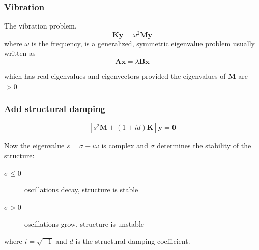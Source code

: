 \documentclass{beamer}
\newcommand{\Matrix}[1]{\boldsymbol{#1}}
\newcommand{\Vector}[1]{\boldsymbol{#1}}
\begin{document}
\begin{frame}
	\frametitle{Vibration}
	The vibration problem,
	\begin{equation}\label{eqn:vibe}
		\Matrix{K}\Vector{y} = \omega^2 \Matrix{M}\Vector{y} \nonumber
	\end{equation}
	where $\omega$ is the frequency, is a generalized, symmetric eigenvalue problem
	usually written as
	\begin{equation}
		\Matrix{A}\Vector{x} = \lambda \Matrix{B}\Vector{x}
	\end{equation}

	\vspace{5mm}
	which has real eigenvalues and eigenvectors provided the eigenvalues of $\Matrix{M}$ are $> 0$
\end{frame}

\begin{frame}
	\frametitle{Add structural damping}
	\begin{equation}\label{eqn:sdamp}
		\left[ s^2 \Matrix{M} + (1+id)\Matrix{K}\right]\Vector{y} = \Vector{0} \nonumber
	\end{equation}

	\vspace{5mm}
	Now the eigenvalue $s = \sigma + i\omega$ is complex and $\sigma$ determines the stability of
	the structure:
	\begin{description}
		\item[$\sigma \le 0$] oscillations decay, structure is stable
		\item[$\sigma > 0$] oscillations grow, structure is unstable
	\end{description}
	where $i = \sqrt{-1}$ and $d$ is the structural damping coefficient.
\end{frame}
\end{document}
